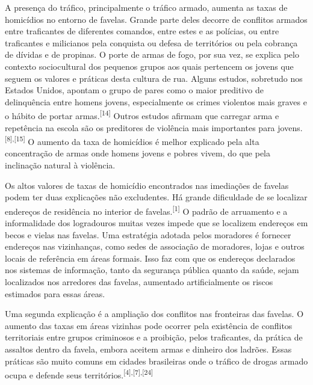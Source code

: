 \documentclass{article}
\begin{document}
A presença do tráfico, principalmente o tráfico armado, aumenta as taxas de
homicídios no entorno de favelas. Grande parte deles decorre de conflitos
armados entre traficantes de diferentes comandos, entre estes e as polícias, ou
entre traficantes e milicianos pela conquista ou defesa de territórios ou pela
cobrança de dívidas e de propinas. O porte de armas de fogo, por sua vez, se
explica pelo contexto sociocultural dos pequenos grupos aos quais pertencem os
jovens que seguem os valores e práticas desta cultura de rua. Alguns estudos,
sobretudo nos Estados Unidos, apontam o grupo de pares como o maior preditivo de
delinquência entre homens jovens, especialmente os crimes violentos mais graves
e o hábito de portar armas.\textsuperscript{[}\textsuperscript{14}\textsuperscript{]}
Outros estudos afirmam que carregar arma e repetência na escola são os
preditores de violência mais importantes para
jovens.\textsuperscript{[}\textsuperscript{8}\textsuperscript{]}\textsuperscript{,}\textsuperscript{[}\textsuperscript{15}\textsuperscript{]}
O aumento da taxa de homicídios é melhor explicado pela alta concentração de
armas onde homens jovens e pobres vivem, do que pela inclinação natural à
violência.

Os altos valores de taxas de homicídio encontrados nas imediações de favelas
podem ter duas explicações não excludentes. Há grande dificuldade de se
localizar endereços de residência no interior de
favelas.\textsuperscript{[}\textsuperscript{1}\textsuperscript{]}
O padrão de arruamento e a informalidade dos logradouros muitas vezes impede que
se localizem endereços em becos e vielas nas favelas. Uma estratégia adotada
pelos moradores é fornecer endereços nas vizinhanças, como sedes de associação
de moradores, lojas e outros locais de referência em áreas formais. Isso faz com
que os endereços declarados nos sistemas de informação, tanto da segurança
pública quanto da saúde, sejam localizados nos arredores das favelas, aumentado
artificialmente os riscos estimados para essas áreas.

Uma segunda explicação é a ampliação dos conflitos nas fronteiras das favelas. O
aumento das taxas em áreas vizinhas pode ocorrer pela existência de conflitos
territoriais entre grupos criminosos e a proibição, pelos traficantes, da
prática de assaltos dentro da favela, embora aceitem armas e dinheiro dos
ladrões. Essas práticas são muito comuns em cidades brasileiras onde o tráfico
de drogas armado ocupa e defende seus
territórios.\textsuperscript{[}\textsuperscript{4}\textsuperscript{]}\textsuperscript{,}\textsuperscript{[}\textsuperscript{7}\textsuperscript{]}\textsuperscript{,}\textsuperscript{[}\textsuperscript{24}\textsuperscript{]}
\end{document}

